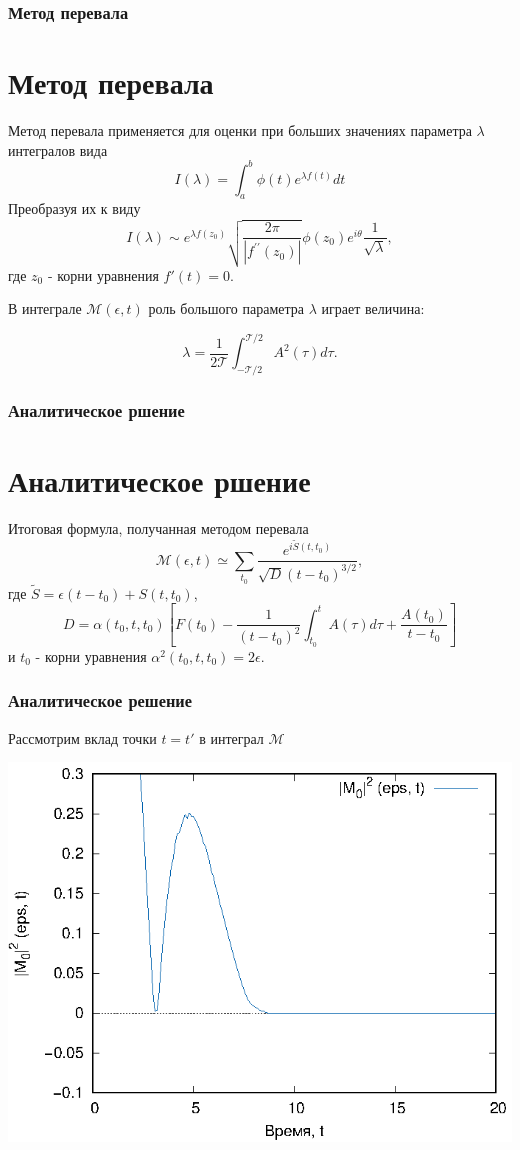 \documentclass{beamer}
\newcommand{\cM}{\mathcal{M}}
\newcommand{\cT}{\mathcal{T}}
\begin{document}
\frame
{
	\frametitle{Метод перевала}
	\section{Метод перевала}
	Метод перевала применяется для оценки при больших значениях параметра $\lambda$ интегралов вида
	\begin{equation}\nonumber
	I(\lambda) = \int_{a}^{b}\phi(t)e^{\lambda f(t)}dt
	\end{equation}
	Преобразуя их к виду
	\begin{equation}\nonumber
	I(\lambda) \sim e^{\lambda f (z_0)}\sqrt{\frac{2\pi}{|f^{\prime \prime} (z_0)|}} \phi(z_0) e^{i \theta} \frac{1}{\sqrt{\lambda}},
	\end{equation}
	где $z_0$ - корни уравнения $f'(t) = 0$.
	
	В интеграле $\cM(\epsilon,t)$ роль большого параметра $\lambda$ играет величина:
	
	\begin{equation}\label{eq.lambda}
	\lambda = \frac{1}{2 \cT} \int_{-\cT/2}^{\cT/2} A^2(\tau) d\tau.
	\end{equation}
}

\frame
{
	\frametitle{Аналитическое ршение}
	\section{Аналитическое ршение}
	Итоговая формула, получанная методом перевала
	\begin{equation}
	\cM(\epsilon, t) \simeq \sum_{t_0}\frac{e^{i\widetilde{S}(t, t_0)} }{\sqrt{D} (t-t_0)^{3/2}},
	\end{equation}
	где $\widetilde{S} = \epsilon (t - t_0) + S(t, t_0)$,
	$$
	D = \alpha(t_0, t, t_0)\left[F(t_0) - \frac{1}{(t - t_0)^2} \int_{t_0}^{t}A(\tau)d\tau +  \frac{A(t_0)}{t-t_0} \right]
	$$
	и $t_0$ - корни уравнения $\alpha ^2 (t_0, t, t_0) = 2 \epsilon$.	
}

\frame
{
	\frametitle{Аналитическое решение}
	Рассмотрим вклад точки $t = t'$ в интеграл $\cM$
	
	\begin{center}
		\includegraphics{I_0}  
	\end{center}	
}
\end{document}
